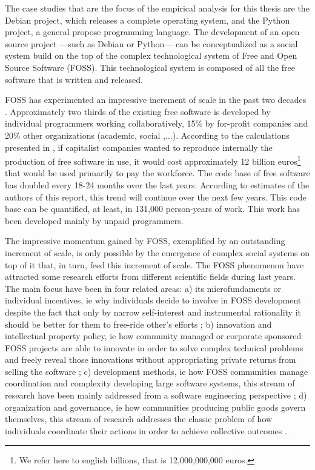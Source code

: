 The case studies that are the focus of the empirical analysis for this thesis are the Debian project, which releases a complete operating system, and the Python project, a general propose programming language. The development of an open source project ---such as Debian or Python--- can be conceptualized as a social system build on the top of the complex technological system of Free and Open Source Software (FOSS). This technological system is composed of all the free software that is written and released.

FOSS has experimented an impressive increment of scale in the past two decades \citep{ghosh:2006}. Approximately two thirds of the existing free software is developed by individual programmers working collaboratively, 15\% by for-profit companies and 20\% other organizations (academic, social ,...). According to the calculations presented in \citet{ghosh:2006}, if capitalist companies wanted to reproduce internally the production of free software in use, it would cost approximately 12 billion euros\footnote{We refer here to english billions, that is 12,000,000,000 euros.} that would be used primarily to pay the workforce. The code base of free software has doubled every 18-24 months over the last years. According to estimates of the authors of this report, this trend will continue over the next few years. This code base can be quantified, at least, in 131,000 person-years of work. This work has been developed mainly by unpaid programmers.

The impressive momentum gained by FOSS, exemplified by an outstanding increment of scale, is only possible by the emergence of complex social systems on top of it that, in turn, feed this increment of scale. The FOSS phenomenon have attracted some research efforts from different scientific fields during last years. The main focus have been in four related areas: a) its microfundaments or individual incentives, ie why individuals decide to involve in FOSS development despite the fact that only by narrow self-interest and instrumental rationality it should be better for them to free-ride other's efforts \citep{hars:2002,lerner:2002,lakhani:2003,hertel:2003,weber:2004,roberts:2006,bagozzi:2006}; b) innovation and intellectual property policy, ie how community managed or corporate sponsored FOSS projects are able to innovate in order to solve complex technical problems and freely reveal those innovations without appropriating private returns from selling the software \citep{moglen:1999,kogut:2001,hippel:2001,hippel:2003,vonKrogh2003,omahony:2003,west:2003,lerner:2005,hargrave:2006,west:2008}; c) development methods, ie how FOSS communities manage coordination and complexity developing large software systems, this stream of research have been mainly addressed from a software engineering perspective \citep{godfrey:2000,feller:2000,mockus:2002,koch:2002,weber:2004,maccormack:2006}; d) organization and governance, ie how communities producing public goods govern themselves, this stream of research addresses the classic problem of how individuals coordinate their actions in order to achieve collective outcomes \citep{ljungberg:2000,omahony:2007,west:2008}.

